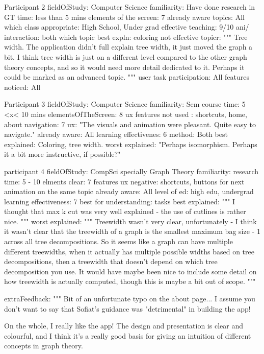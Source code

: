 Participant 2
   fieldOfStudy: Computer Science
   familiarity: Have done research in GT
   time: less than 5 mins
   elements of the screen: 7
   already aware topics: All
   which class appropriate: High School, Under grad
   effective teaching: 9/10
   ani/ interaction: both
   which topic best expln:  coloring
   not effective topicr:
      """ 
      Tree width. The application didn't full explain tree width, it just
      moved the graph a bit. I think tree width is just on a different level
      compared to the other graph theory concepts, and so it would need more
      detail dedicated to it. Perhaps it could be marked as an advanced topic.
      """
   user task participation: All
   features noticed: All

Participant 3
   fieldOfStudy: Computer Science
   familiarity: Sem course
   time: 5 <x< 10 mins
   elementsOfTheScreen: 8
   ux features not used :  shortcuts, home, about
   navigation: 7
   ux: "The visuals and animation were pleasant. Quite easy to navigate." 
   already aware: All
   learning effectivenes: 6
   method: Both
   best explained: Coloring, tree width.
   worst explained: "Perhaps isomorphism. Perhaps it a bit more instructive, if possible?"

participant 4
   fieldOfStudy: CompSci specially Graph Theory
   familiarity: research
   time: 5 - 10
   elments clear: 7
   features ux negative: shortcuts, buttons for next animation on the same topic
   already aware: All
   level of ed: high edu, undergrad
   learning effectiveness: 7
   best for understanding: tasks
   best explained:
      """
      I thought that max k cut was very well explained - the use of cutlines is rather nice.
      """
   worst explained:
      """
      Treewidth wasn't very clear, unfortunately - I think it wasn't clear that
      the treewidth of a graph is the smallest maximum bag size - 1 across all
      tree decompositions. So it seems like a graph can have multiple different
      treewidths, when it actually has multiple possible widths based on tree
      decompositions, then a treewidth that doesn't depend on which tree
      decomposition you use. It would have maybe been nice to include some
      detail on how treewidth is actually computed, though this is maybe a bit
      out of scope.  
      """

   extraFeedback:
      """ 
      Bit of an unfortunate typo on the about page... I assume you don't
      want to say that Sofiat's guidance was "detrimental" in building the app!

      On the whole, I really like the app! The design and presentation is clear
      and colourful, and I think it's a really good basis for giving an
      intuition of different concepts in graph theory. 

